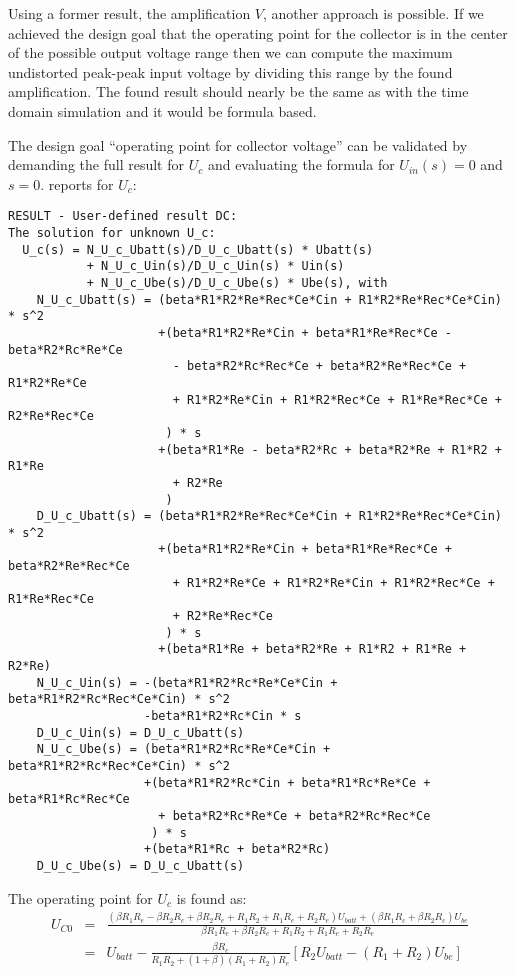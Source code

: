 Using a former result, the amplification $V$, another approach is possible.
If we achieved the design goal that the operating point for the collector is
in the center of the possible output voltage range then we can compute the
maximum undistorted peak-peak input voltage by dividing this range by
the found amplification. The found result should nearly be the same as
with the time domain simulation and it would be formula based.

The design goal ``operating point for collector voltage'' can be validated by
demanding the full result for $U_c$ and evaluating the formula for
$U_{in}(s)=0$ and $s=0$. \linnet{} reports for $U_c$:
\begin{verbatim}
RESULT - User-defined result DC:
The solution for unknown U_c:
  U_c(s) = N_U_c_Ubatt(s)/D_U_c_Ubatt(s) * Ubatt(s)
           + N_U_c_Uin(s)/D_U_c_Uin(s) * Uin(s)
           + N_U_c_Ube(s)/D_U_c_Ube(s) * Ube(s), with
    N_U_c_Ubatt(s) = (beta*R1*R2*Re*Rec*Ce*Cin + R1*R2*Re*Rec*Ce*Cin) * s^2
                     +(beta*R1*R2*Re*Cin + beta*R1*Re*Rec*Ce - beta*R2*Rc*Re*Ce
                       - beta*R2*Rc*Rec*Ce + beta*R2*Re*Rec*Ce + R1*R2*Re*Ce
                       + R1*R2*Re*Cin + R1*R2*Rec*Ce + R1*Re*Rec*Ce + R2*Re*Rec*Ce
                      ) * s
                     +(beta*R1*Re - beta*R2*Rc + beta*R2*Re + R1*R2 + R1*Re
                       + R2*Re
                      )
    D_U_c_Ubatt(s) = (beta*R1*R2*Re*Rec*Ce*Cin + R1*R2*Re*Rec*Ce*Cin) * s^2
                     +(beta*R1*R2*Re*Cin + beta*R1*Re*Rec*Ce + beta*R2*Re*Rec*Ce
                       + R1*R2*Re*Ce + R1*R2*Re*Cin + R1*R2*Rec*Ce + R1*Re*Rec*Ce
                       + R2*Re*Rec*Ce
                      ) * s
                     +(beta*R1*Re + beta*R2*Re + R1*R2 + R1*Re + R2*Re)
    N_U_c_Uin(s) = -(beta*R1*R2*Rc*Re*Ce*Cin + beta*R1*R2*Rc*Rec*Ce*Cin) * s^2
                   -beta*R1*R2*Rc*Cin * s
    D_U_c_Uin(s) = D_U_c_Ubatt(s)
    N_U_c_Ube(s) = (beta*R1*R2*Rc*Re*Ce*Cin + beta*R1*R2*Rc*Rec*Ce*Cin) * s^2
                   +(beta*R1*R2*Rc*Cin + beta*R1*Rc*Re*Ce + beta*R1*Rc*Rec*Ce
                     + beta*R2*Rc*Re*Ce + beta*R2*Rc*Rec*Ce
                    ) * s
                   +(beta*R1*Rc + beta*R2*Rc)
    D_U_c_Ube(s) = D_U_c_Ubatt(s)
\end{verbatim}

The operating point for $U_c$ is found as:
\begin{eqnarray}
U_{C0} & = & \frac{(\beta R_1 R_e - \beta R_2 R_c + \beta R_2 R_e + R_1 R_2 + R_1 R_e
                    + R_2 R_e
                   ) U_{batt}
                   + (\beta R_1 R_c + \beta R_2 R_c) U_{be}
                  }
                  {\beta R_1 R_e + \beta R_2 R_e + R_1 R_2 + R_1 R_e + R_2 R_e}
\nonumber \\
       & = & U_{batt} - \frac{\beta R_c}{R_1 R_2 + (1+\beta) (R_1+R_2) R_e}
                        [R_2 U_{batt} - (R_1+R_2) U_{be}]
\label{eqTOperatingPoint}
\end{eqnarray}

